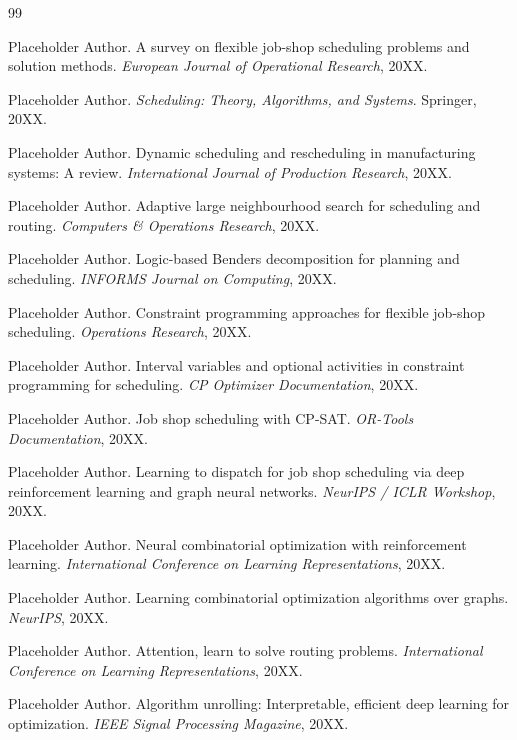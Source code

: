 \documentclass[UTF8,12pt,a4paper]{ctexart}
\begin{document}
\begin{thebibliography}{99}

Placeholder Author. A survey on flexible job-shop scheduling problems and solution methods. \emph{European Journal of Operational Research}, 20XX.

Placeholder Author. \emph{Scheduling: Theory, Algorithms, and Systems}. Springer, 20XX.

Placeholder Author. Dynamic scheduling and rescheduling in manufacturing systems: A review. \emph{International Journal of Production Research}, 20XX.

Placeholder Author. Adaptive large neighbourhood search for scheduling and routing. \emph{Computers \& Operations Research}, 20XX.

Placeholder Author. Logic-based Benders decomposition for planning and scheduling. \emph{INFORMS Journal on Computing}, 20XX.

Placeholder Author. Constraint programming approaches for flexible job-shop scheduling. \emph{Operations Research}, 20XX.

Placeholder Author. Interval variables and optional activities in constraint programming for scheduling. \emph{CP Optimizer Documentation}, 20XX.

Placeholder Author. Job shop scheduling with CP-SAT. \emph{OR-Tools Documentation}, 20XX.

Placeholder Author. Learning to dispatch for job shop scheduling via deep reinforcement learning and graph neural networks. \emph{NeurIPS / ICLR Workshop}, 20XX.

Placeholder Author. Neural combinatorial optimization with reinforcement learning. \emph{International Conference on Learning Representations}, 20XX.

Placeholder Author. Learning combinatorial optimization algorithms over graphs. \emph{NeurIPS}, 20XX.

Placeholder Author. Attention, learn to solve routing problems. \emph{International Conference on Learning Representations}, 20XX.

Placeholder Author. Algorithm unrolling: Interpretable, efficient deep learning for optimization. \emph{IEEE Signal Processing Magazine}, 20XX.


\end{thebibliography}
\end{document}
